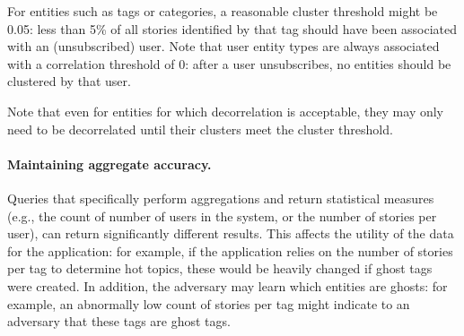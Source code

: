 For entities such as tags or categories, a reasonable cluster threshold might be 0.05: less than
5\% of all stories identified by that tag should have been associated with an (unsubscribed) user. Note
that user entity types are always associated with a correlation threshold of 0: after a user
unsubscribes, no entities should be clustered by that user.

Note that even for entities for which decorrelation is acceptable, they may only need to be
decorrelated until their clusters meet the cluster threshold.

\paragraph{Maintaining aggregate accuracy.}
Queries that specifically perform aggregations and return statistical measures (e.g.,
the count of number of users in the system, or the number of stories per user), can return
significantly different results. This affects the utility of the data for the application: for
example, if the application relies on the number of stories per tag to determine hot topics, these
would be heavily changed if ghost tags were created.  In addition, the adversary may learn which
entities are ghosts: for example, an abnormally low count of stories per tag might indicate to an
adversary that these tags are ghost tags.  

